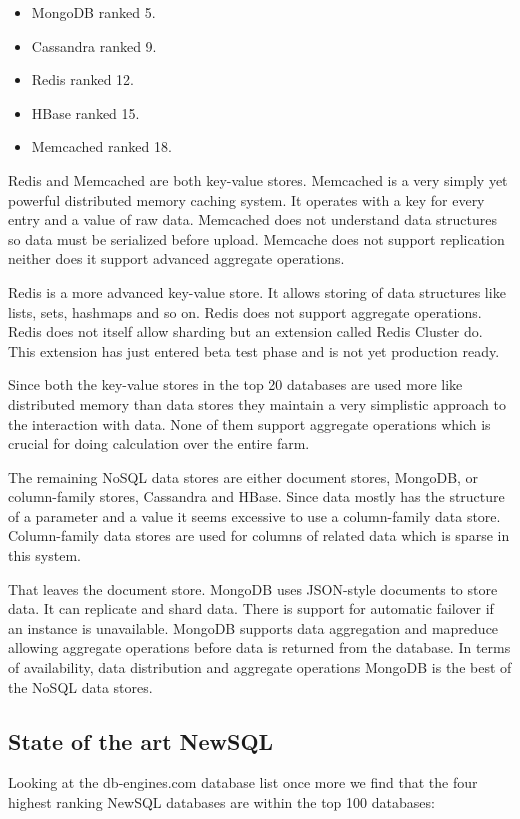 \begin{itemize}
\item MongoDB\cite{mongodb} ranked 5.
\item Cassandra\cite{cassandra} ranked 9.
\item Redis\cite{redis} ranked 12.
\item HBase\cite{hbase} ranked 15.
\item Memcached\cite{memcached} ranked 18.
\end{itemize}

Redis and Memcached are both key-value stores. Memcached is a very simply yet powerful distributed memory caching system.
It operates with a key for every entry and a value of raw data.
Memcached does not understand data structures so data must be serialized before upload.
Memcache does not support replication neither does it support advanced aggregate operations.

Redis is a more advanced key-value store.
It allows storing of data structures like lists, sets, hashmaps and so on.
Redis does not support aggregate operations.
Redis does not itself allow sharding but an extension called Redis Cluster do. This extension has just entered beta test phase and is not yet production ready.

Since both the key-value stores in the top 20 databases are used more like distributed memory than data stores they maintain a very simplistic approach to the interaction with data.
None of them support aggregate operations which is crucial for doing calculation over the entire farm.

The remaining NoSQL data stores are either document stores, MongoDB, or column-family stores, Cassandra and HBase.
Since data mostly has the structure of a parameter and a value it seems excessive to use a column-family data store. 
Column-family data stores are used for columns of related data which is sparse in this system.

That leaves the document store. MongoDB uses JSON-style documents to store data.
It can replicate and shard data. 
There is support for automatic failover if an instance is unavailable.
MongoDB supports data aggregation and mapreduce allowing aggregate operations before data is returned from the database.
In terms of availability, data distribution and aggregate operations MongoDB is the best of the NoSQL data stores.

\subsection{State of the art NewSQL}
Looking at the db-engines.com database list once more we find that the four highest ranking NewSQL databases are within the top 100 databases:

